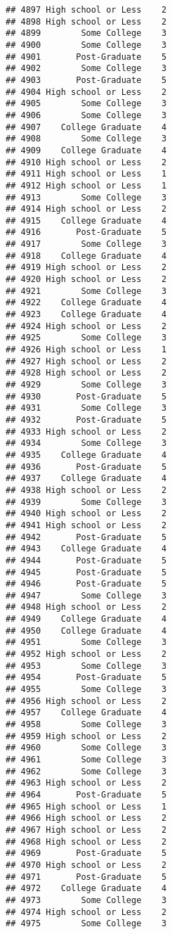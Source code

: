 \documentclass[
]{article}
\begin{document}
\begin{verbatim}
## 4897 High school or Less    2
## 4898 High school or Less    2
## 4899        Some College    3
## 4900        Some College    3
## 4901       Post-Graduate    5
## 4902        Some College    3
## 4903       Post-Graduate    5
## 4904 High school or Less    2
## 4905        Some College    3
## 4906        Some College    3
## 4907    College Graduate    4
## 4908        Some College    3
## 4909    College Graduate    4
## 4910 High school or Less    2
## 4911 High school or Less    1
## 4912 High school or Less    1
## 4913        Some College    3
## 4914 High school or Less    2
## 4915    College Graduate    4
## 4916       Post-Graduate    5
## 4917        Some College    3
## 4918    College Graduate    4
## 4919 High school or Less    2
## 4920 High school or Less    2
## 4921        Some College    3
## 4922    College Graduate    4
## 4923    College Graduate    4
## 4924 High school or Less    2
## 4925        Some College    3
## 4926 High school or Less    1
## 4927 High school or Less    2
## 4928 High school or Less    2
## 4929        Some College    3
## 4930       Post-Graduate    5
## 4931        Some College    3
## 4932       Post-Graduate    5
## 4933 High school or Less    2
## 4934        Some College    3
## 4935    College Graduate    4
## 4936       Post-Graduate    5
## 4937    College Graduate    4
## 4938 High school or Less    2
## 4939        Some College    3
## 4940 High school or Less    2
## 4941 High school or Less    2
## 4942       Post-Graduate    5
## 4943    College Graduate    4
## 4944       Post-Graduate    5
## 4945       Post-Graduate    5
## 4946       Post-Graduate    5
## 4947        Some College    3
## 4948 High school or Less    2
## 4949    College Graduate    4
## 4950    College Graduate    4
## 4951        Some College    3
## 4952 High school or Less    2
## 4953        Some College    3
## 4954       Post-Graduate    5
## 4955        Some College    3
## 4956 High school or Less    2
## 4957    College Graduate    4
## 4958        Some College    3
## 4959 High school or Less    2
## 4960        Some College    3
## 4961        Some College    3
## 4962        Some College    3
## 4963 High school or Less    2
## 4964       Post-Graduate    5
## 4965 High school or Less    1
## 4966 High school or Less    2
## 4967 High school or Less    2
## 4968 High school or Less    2
## 4969       Post-Graduate    5
## 4970 High school or Less    2
## 4971       Post-Graduate    5
## 4972    College Graduate    4
## 4973        Some College    3
## 4974 High school or Less    2
## 4975        Some College    3

\end{verbatim}
\end{document}
